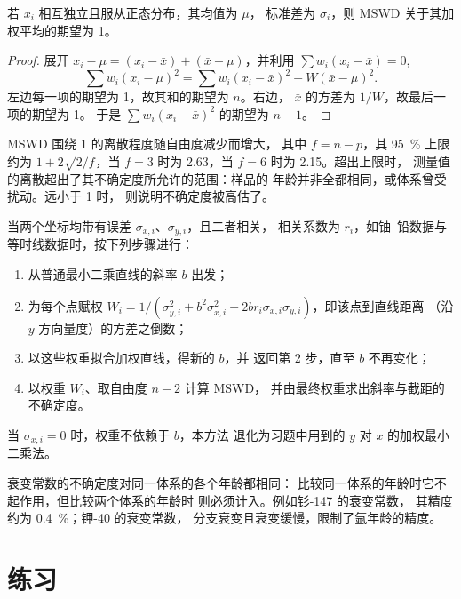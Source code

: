 \begin{proposition}[加权偏差均方的期望为 1]\label{prop:b3:advanced-geochronology:mswd}
若 $x_i$ 相互独立且服从正态分布，其均值为 $\mu$，
标准差为 $\sigma_i$，则 MSWD 关于其加权平均的期望为 1。
\end{proposition}

\begin{proof}
展开 $x_i - \mu = (x_i - \bar x) + (\bar x - \mu)$，并利用 $\sum
w_i(x_i - \bar x) = 0$,
\[
\sum w_i(x_i - \mu)^2 = \sum w_i(x_i - \bar x)^2 + W(\bar x - \mu)^2.
\]
左边每一项的期望为 1，故其和的期望为 $n$。右边，
$\bar x$ 的方差为 $1/W$，故最后一项的期望为 1。
于是 $\sum w_i(x_i - \bar x)^2$ 的期望为 $n - 1$。
\end{proof}

MSWD 围绕 1 的离散程度随自由度减少而增大，
其中 $f = n - p$，其 \qty{95}{\percent} 上限约为 $1 +
2\sqrt{2/f}$，当 $f = 3$ 时为 2.63，当 $f = 6$ 时为 2.15。超出上限时，
测量值的离散超出了其不确定度所允许的范围：样品的
年龄并非全都相同，或体系曾受扰动。远小于 1 时，
则说明不确定度被高估了。

\begin{method}[两轴均有误差时的等时线拟合]\label{met:b3:advanced-geochronology:york}
当两个坐标均带有误差 $\sigma_{x,i}$、$\sigma_{y,i}$，且二者相关，
相关系数为 $r_i$，如铀–铅数据与等时线数据时，按下列步骤进行：
\begin{enumerate}
\item 从普通最小二乘直线的斜率 $b$ 出发；
\item 为每个点赋权 $W_i = 1/(\sigma_{y,i}^2 + b^2\sigma_{x,i}^2 -
2br_i\sigma_{x,i}\sigma_{y,i})$，即该点到直线距离
（沿 $y$ 方向量度）的方差之倒数；
\item 以这些权重拟合加权直线，得新的 $b$，并
返回第 2 步，直至 $b$ 不再变化；
\item 以权重 $W_i$、取自由度 $n - 2$ 计算 MSWD，
并由最终权重求出斜率与截距的不确定度。
\end{enumerate}
当 $\sigma_{x,i} = 0$ 时，权重不依赖于 $b$，本方法
退化为习题中用到的 $y$ 对 $x$ 的加权最小二乘法。
\end{method}

衰变常数的不确定度对同一体系的各个年龄都相同：
比较同一体系的年龄时它不起作用，但比较两个体系的年龄时
则必须计入。例如钐-147 的衰变常数，
其精度约为 \qty{0.4}{\percent}；钾-40 的衰变常数，
分支衰变且衰变缓慢，限制了氩年龄的精度。


\section{练习}

